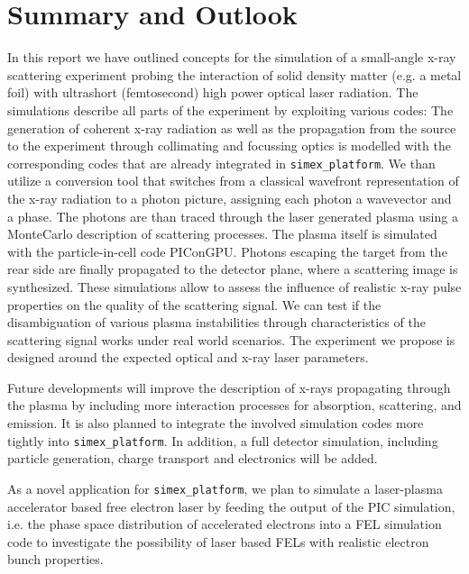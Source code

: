 \documentclass[12pt]{scrartcl}
\begin{document}
\section{Summary and Outlook}
In this report we have outlined concepts for the simulation of a small-angle
x-ray scattering experiment probing the interaction of solid density matter
(e.g. a metal foil) with ultrashort (femtosecond) high power optical laser
radiation. The simulations describe all parts of the experiment by exploiting
various codes: The generation of coherent x-ray radiation as well as the
propagation from the source to the experiment through collimating and focussing
optics is modelled with the corresponding codes that are already integrated in
\texttt{simex\_platform}. We than utilize a conversion tool that switches from a
classical wavefront representation of the x-ray radiation to a photon picture,
assigning each photon a wavevector and a phase. The photons are than traced
through the laser generated plasma using a MonteCarlo description of scattering
processes. The plasma itself
is simulated with the particle-in-cell code PIConGPU. Photons
escaping the target from the rear side are finally propagated to the detector
plane, where a scattering image is synthesized. These simulations allow to
assess the influence of realistic x-ray pulse properties on the quality of the
scattering signal. We can test if the disambiguation of various plasma
instabilities through characteristics of the scattering signal works under real
world scenarios.
The experiment we propose is designed around the expected optical and x-ray
laser parameters.

Future developments will improve the description of x-rays propagating through
the plasma by including more interaction processes for absorption, scattering,
and emission. It is also planned to integrate the involved simulation codes more
tightly into \texttt{simex\_platform}. In addition, a full detector simulation,
including particle generation, charge transport and electronics will be added.

As a novel application for \texttt{simex\_platform}, we plan to simulate a
laser-plasma accelerator based free electron laser by feeding the output of the
PIC simulation, i.e. the phase space distribution of accelerated electrons into
a FEL simulation code to investigate the possibility of laser based FELs with
realistic electron bunch properties.

\printbibliography[]
\end{document}

